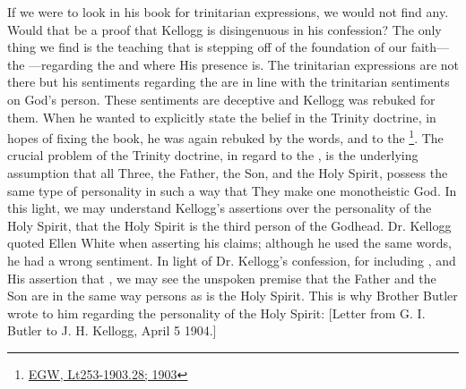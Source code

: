If we were to look in his book for trinitarian expressions, we would not find any. Would that be a proof that Kellogg is disingenuous in his confession? The only thing we find is the teaching that is stepping off of the foundation of our faith—the —regarding the  and where His presence is. The trinitarian expressions are not there but his sentiments regarding the  are in line with the trinitarian sentiments on God’s person. These sentiments are deceptive and Kellogg was rebuked for them. When he wanted to explicitly state the belief in the Trinity doctrine, in hopes of fixing the book, he was again rebuked by the words,  and to the \footnote{\href{https://egwwritings.org/?ref=en_Lt253-1903.28&para=9980.36}{EGW, Lt253-1903.28; 1903}}. The crucial problem of the Trinity doctrine, in regard to the , is the underlying assumption that all Three, the Father, the Son, and the Holy Spirit, possess the same type of personality in such a way that They make one monotheistic God. In this light, we may understand Kellogg's assertions over the personality of the Holy Spirit, that the Holy Spirit is the third person of the Godhead. Dr. Kellogg quoted Ellen White when asserting his claims; although he used the same words, he had a wrong sentiment. In light of Dr. Kellogg’s confession, for including , and His assertion that , we may see the unspoken premise that the Father and the Son are in the same way persons as is the Holy Spirit. This is why Brother Butler wrote to him regarding the personality of the Holy Spirit: [Letter from G. I. Butler to J. H. Kellogg, April 5 1904.]


